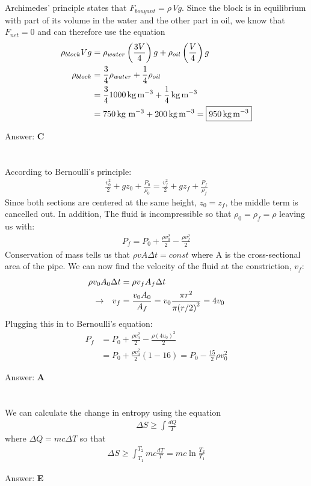 \documentclass[12pt]{article}
\newcommand{\Answer}[1]{Answer: \textbf{#1}}
\newcommand{\Problem}[3]{
    \setcounter{section}{#1}
    \addtocounter{section}{-1}
    \section{}
    #3\par\par
    \Answer{#2}
}
\begin{document}
\Problem{31}{C}{%
Archimedes' principle states that $F_{bouyant} = \rho\, V g$. Since the block is in equilibrium with part of its volume in the water and the other part in oil, we know that $F_{net}= 0$ and can therefore use the equation
\begin{align}
\rho_{block} V g &= \rho_{water} \left(\frac{3V}{4}\right) g + \rho_{oil} \left(\frac{V}{4}\right) g\nonumber\\
\rho_{block} &=  \frac{3}{4}\rho_{water} +\frac{1}{4}  \rho_{oil} \nonumber\\
&= \frac{3}{4} 1000\,\text{kg\,m$^{-3}$}+ \frac{1}{4}\,\text{kg\,m$^{-3}$}\nonumber\\
&= 750\,\text{kg m$^{-3}$}+200\,\text{kg\,m$^{-3}$} = \boxed{950\,\text{kg\,m$^{-3}$}}\nonumber
\end{align}
}

\Problem{32}{A}{%
According to Bernoulli's principle:
\begin{align}
\frac{v_{0}^{2}}{2} + g z_{0}+ \frac{P_{0}}{\rho_{0}} = \frac{v_{f}^{2}}{2} + g z_{f} + \frac{P_{f}}{\rho_{f}}
\end{align}
Since both sections are centered at the same height, $z_{0} = z_{f}$, the middle term is cancelled out. In addition, The fluid is incompressible so that $\rho_{0} = \rho_{f} = \rho$ leaving us with:
\begin{align}
P_{f} = P_{0} + \frac{\rho v_{0}^{2}}{2}  - \frac{\rho v_{f}^{2}}{2}\nonumber
\end{align}
Conservation of mass tells us that $\rho v A \Delta t = const$ where A is the cross-sectional area of the pipe. We can now find the velocity of the fluid at the constriction, $v_{f}$:
\begin{align}
\rho v_{0} A_{0} \Delta t &= \rho v_{f} A_{f} \Delta t \nonumber\\
\rightarrow \hspace{.1in} v_{f} &= \frac{v_{0}A_{0}}{A_{f}} = v_{0} \frac{\pi r^2}{\pi {(r/2)}^2}= 4v_{0}\nonumber
\end{align}
Plugging this in to Bernoulli's equation:
\begin{align}
P_{f} &= P_{0} + \frac{\rho v_{0}^{2}}{2}  - \frac{\rho {(4v_{0})}^{2}}{2}\nonumber\\
&= P_{0} +\frac{\rho v_{0}^{2}}{2}\left(1-16\right)= \boxed{P_{0} -\frac{15}{2}\rho v_{0}^{2}}\nonumber
\end{align}
}

\Problem{33}{E}{%
We can calculate the change in entropy using the equation
\begin{align}
\Delta S \geq \int \frac{d Q}{T}
\end{align}
where $\Delta Q = mc \Delta T$ so that
\begin{align}
\Delta S \geq \int_{T_{1}}^{T_{2}} mc\frac{dT}{T} = \boxed{mc \ln{\frac{T_{2}}{T_{1}}}}\nonumber
\end{align}
}
\end{document}
